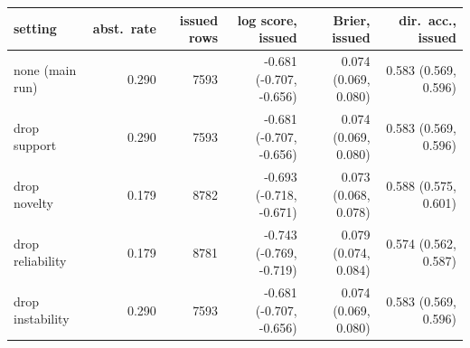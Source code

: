 \begin{tabular}{lrrrrr}
\toprule
setting & abst.\ rate & issued rows & log score, issued & Brier, issued & dir.\ acc., issued \\
\midrule
none (main run) & 0.290 & 7593 & -0.681 (-0.707, -0.656) & 0.074 (0.069, 0.080) & 0.583 (0.569, 0.596) \\
drop support & 0.290 & 7593 & -0.681 (-0.707, -0.656) & 0.074 (0.069, 0.080) & 0.583 (0.569, 0.596) \\
drop novelty & 0.179 & 8782 & -0.693 (-0.718, -0.671) & 0.073 (0.068, 0.078) & 0.588 (0.575, 0.601) \\
drop reliability & 0.179 & 8781 & -0.743 (-0.769, -0.719) & 0.079 (0.074, 0.084) & 0.574 (0.562, 0.587) \\
drop instability & 0.290 & 7593 & -0.681 (-0.707, -0.656) & 0.074 (0.069, 0.080) & 0.583 (0.569, 0.596) \\
\bottomrule
\end{tabular}
